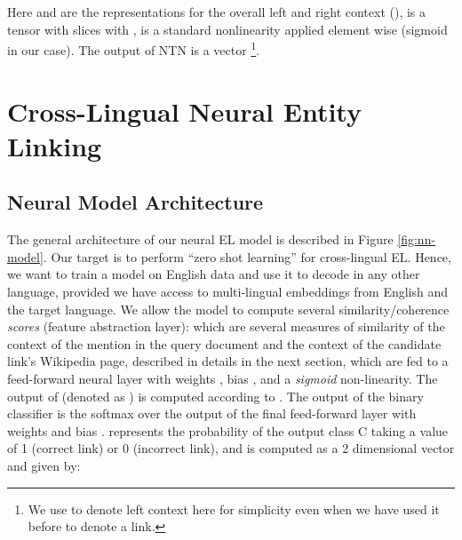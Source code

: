 \documentclass[letterpaper]{article} \usepackage{aaai18}  \usepackage{times}  \usepackage{helvet}  \usepackage{courier}  \usepackage{url}  \usepackage{graphicx}  \frenchspacing  \setlength{\pdfpagewidth}{8.5in}  \setlength{\pdfpageheight}{11in}  \usepackage{latexsym}
\begin{document}
Here  and  are the representations for the overall left and right context (),  is a tensor with  slices with ,  is a standard nonlinearity applied element wise (sigmoid in our case). The output of NTN is a vector  \footnote{We use  to denote left context here for simplicity even when we have used it before to denote a link.}.
















































 \section{Cross-Lingual Neural Entity Linking}
\label{sec:model}

\subsection{Neural Model Architecture}
The general architecture of our neural EL model is described in Figure \ref{fig:nn-model}.  Our target is to perform ``zero shot learning'' \cite{socher2013zero,palatucci2009zero} for cross-lingual EL. Hence, we want to train a model on English data and use it to decode in any other language, provided we have access to multi-lingual embeddings from English and the target language. We allow the model to compute several similarity/coherence \textit{scores}  (feature abstraction layer): which are several measures of similarity of the context of the mention  in the query document and the context of the candidate link's Wikipedia page, described in details in the next section, which are fed to a feed-forward neural layer  with weights , bias , and a \textit{sigmoid} non-linearity. The output of  (denoted as ) is computed according to .
The output of the binary classifier  is the softmax over the output of the final feed-forward layer  with weights  and bias .  represents the probability of the output class C taking a value of 1 (correct link) or 0 (incorrect link), and is computed as a 2 dimensional vector and given by:
\end{document}
